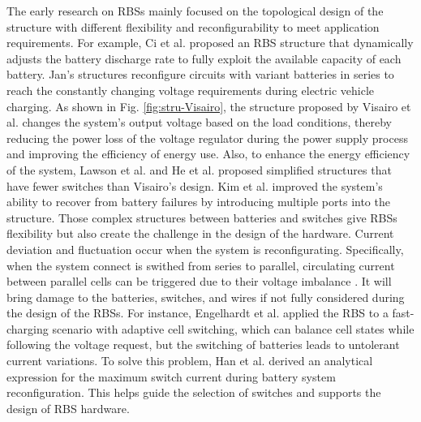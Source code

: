 \documentclass{article}
\begin{document}
The early research on RBSs mainly focused on the topological design of the structure with different flexibility and reconfigurability to meet application requirements.
For example, Ci et al. \cite{ci2007novel} proposed an RBS structure that dynamically adjusts the battery discharge rate to fully exploit the available capacity of each battery. 
Jan's \cite{9209774,engelhardt2021double} structures reconfigure circuits with variant batteries in series to reach the constantly changing voltage requirements during electric vehicle charging.
As shown in Fig. \ref{fig:stru-Visairo}, the structure proposed by Visairo et al. \cite{visairoReconfigurableBatteryPack2008} changes the system's output voltage based on the load conditions, thereby reducing the power loss of the voltage regulator during the power supply process and improving the efficiency of energy use. 
Also, to enhance the energy efficiency of the system, Lawson et al. \cite{lawsonSoftwareConfigurableBattery2012} and He et al. \cite{he2014reconfiguration}  proposed simplified structures that have fewer switches than Visairo's design.
Kim et al. \cite{kim2009dynamic} improved the system's ability to recover from battery failures by introducing multiple ports into the structure. 
Those complex structures between batteries and switches give RBSs flexibility but also create the challenge in the design of the hardware. 
Current deviation and fluctuation occur when the system is reconfigurating.
Specifically, when the system connect is swithed from series to parallel, circulating current between parallel cells can be triggered due to their voltage imbalance \cite{hanAnalysisEstimationMaximum2020}.
It will bring damage to the batteries, switches, and wires if not fully considered during the design of the RBSs.
For instance, Engelhardt et al. \cite{engelhardtDoubleStringBatterySystem2021} applied the RBS to a fast-charging scenario with adaptive cell switching, which can balance cell states while following the voltage request, but the switching of batteries leads to untolerant current variations. 
To solve this problem, Han et al. \cite{han2021analysis} derived an analytical expression for the maximum switch current during battery system reconfiguration. 
This helps guide the selection of switches and supports the design of RBS hardware.
\end{document}
